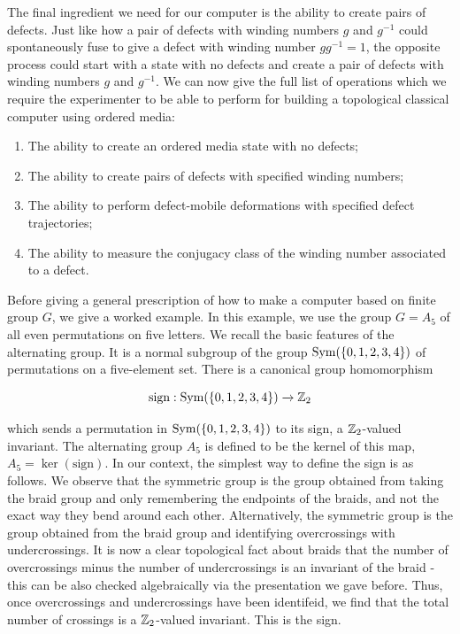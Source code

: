 The final ingredient we need for our computer is the ability to create pairs of defects. Just like how a pair of defects with winding numbers $g$ and $g^{-1}$ could spontaneously fuse to give a defect with winding number $gg^{-1}=1$, the opposite process could start with a state with no defects and create a pair of defects with winding numbers $g$ and $g^{-1}$. We can now give the full list of operations which we require the experimenter to be able to perform for building a topological classical computer using ordered media:

\begin{enumerate}
\item The ability to create an ordered media state with no defects;
\item The ability to create pairs of defects with specified winding numbers;
\item The ability to perform defect-mobile deformations with specified defect trajectories;
\item The ability to measure the conjugacy class of the winding number associated to a defect.
\end{enumerate}

Before giving a general prescription of how to make a computer based on finite group $G$, we give a worked example. In this example, we use the group $G=A_5$ of all even permutations on five letters. We recall the basic features of the alternating group. It is a normal subgroup of the group $ \operatorname{Sym}(\{0,1,2,3,4\})$ of permutations on a five-element set. There is a canonical group homomorphism

$$\text{sign}:\operatorname{Sym}(\{0,1,2,3,4\})\xrightarrow{}{\mathbb Z}_2$$

which sends a permutation in $\operatorname{Sym}(\{0,1,2,3,4\})$ to its sign, a ${\mathbb Z}_2$-valued invariant. The alternating group $A_5$ is defined to be the kernel of this map, $A_5=\ker(\text{sign})$. In our context, the simplest way to define the sign is as follows. We observe that the symmetric group is the group obtained from taking the braid group and only remembering the endpoints of the braids, and not the exact way they bend around each other. Alternatively, the symmetric group is the group obtained from the braid group and identifying overcrossings with undercrossings. It is now a clear topological fact about braids that the number of overcrossings minus the number of undercrossings is an invariant of the braid - this can be also checked algebraically via the presentation we gave before. Thus, once overcrossings and undercrossings have been identifeid, we find that the total number of crossings is a ${\mathbb Z}_2$-valued invariant. This is the sign.

